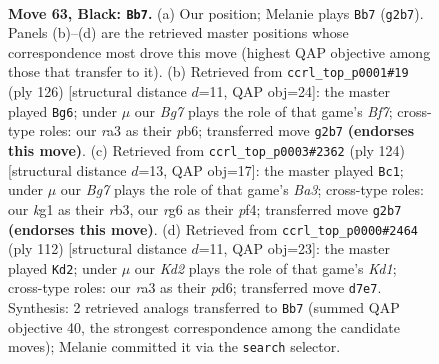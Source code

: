 \documentclass[11pt]{article}
\begin{document}
\clearpage

\begin{figure}[p]\centering
\begin{subfigure}{0.46\textwidth}\centering
\resizebox{\linewidth}{!}{%
\newchessgame
\chessboard[
  setfen={8/3k4/6R1/8/1P6/R7/1r4b1/6K1 b - - 0 63},
  showmover=false,
  pgfstyle=straightmove, color=movearrow, markmove={g2-b7}
]}
\caption{}
\end{subfigure}\hfill
\begin{subfigure}{0.46\textwidth}\centering
\resizebox{\linewidth}{!}{%
\newchessgame
\chessboard[
  setfen={5k2/R4B2/1p6/4K3/8/8/3r4/8 w - - 17 64},
  showmover=false,
  pgfstyle=straightmove, color=movearrow, markmove={f7-g6}
]}
\caption{}
\end{subfigure}
\\[4pt]
\begin{subfigure}{0.46\textwidth}\centering
\resizebox{\linewidth}{!}{%
\newchessgame
\chessboard[
  setfen={R7/8/6k1/8/5p2/Br6/8/K7 w - - 7 63},
  showmover=false,
  pgfstyle=straightmove, color=movearrow, markmove={a3-c1}
]}
\caption{}
\end{subfigure}\hfill
\begin{subfigure}{0.46\textwidth}\centering
\resizebox{\linewidth}{!}{%
\newchessgame
\chessboard[
  setfen={8/R4Bk1/3p4/8/8/4r3/8/3K4 w - - 0 57},
  showmover=false,
  pgfstyle=straightmove, color=movearrow, markmove={d1-d2}
]}
\caption{}
\end{subfigure}
\caption{\textbf{Move 63, Black: \texttt{Bb7}.} (a) Our position; Melanie plays \texttt{Bb7} (\texttt{g2b7}). Panels (b)--(d) are the retrieved master positions whose correspondence most drove this move (highest QAP objective among those that transfer to it). (b) Retrieved from \texttt{ccrl\_top\_p0001\#19} (ply 126) [structural distance $d$=11, QAP obj=24]: the master played \texttt{Bg6}; under $\mu$ our \emph{Bg7} plays the role of that game's \emph{Bf7}; cross-type roles: our \emph{r}a3 as their \emph{p}b6; transferred move \texttt{g2b7} \textbf{(endorses this move)}. (c) Retrieved from \texttt{ccrl\_top\_p0003\#2362} (ply 124) [structural distance $d$=13, QAP obj=17]: the master played \texttt{Bc1}; under $\mu$ our \emph{Bg7} plays the role of that game's \emph{Ba3}; cross-type roles: our \emph{k}g1 as their \emph{r}b3, our \emph{r}g6 as their \emph{p}f4; transferred move \texttt{g2b7} \textbf{(endorses this move)}. (d) Retrieved from \texttt{ccrl\_top\_p0000\#2464} (ply 112) [structural distance $d$=11, QAP obj=23]: the master played \texttt{Kd2}; under $\mu$ our \emph{Kd2} plays the role of that game's \emph{Kd1}; cross-type roles: our \emph{r}a3 as their \emph{p}d6; transferred move \texttt{d7e7}. Synthesis: 2 retrieved analogs transferred to \texttt{Bb7} (summed QAP objective 40, the strongest correspondence among the candidate moves); Melanie committed it via the \texttt{search} selector.}
\label{fig:thought-m125}
\end{figure}
\end{document}
